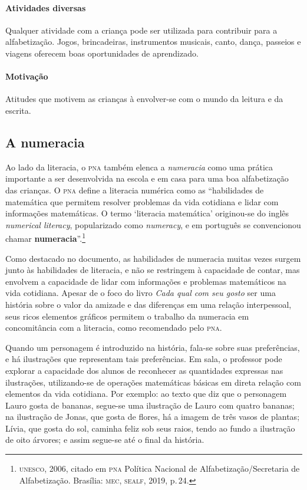 \documentclass[11pt]{extarticle}
\begin{document}
\paragraph{Atividades diversas} Qualquer atividade com a criança 
pode ser utilizada para contribuir para a alfabetização. Jogos, brincadeiras, 
instrumentos musicais, canto, dança, passeios e viagens oferecem boas 
oportunidades de aprendizado.

\paragraph{Motivação} Atitudes que motivem as crianças à envolver-se com 
o mundo da leitura e da escrita.

\subsection{A numeracia}

Ao lado da literacia, o \textsc{pna} também elenca a \textit{numeracia} como uma prática importante a ser desenvolvida na escola e em casa para uma boa alfabetização das crianças.
O \textsc{pna} define a literacia numérica como as ``habilidades de matemática que permitem resolver problemas da vida cotidiana e lidar com informações matemáticas. O termo `literacia
matemática' originou-se do inglês \textit{numerical literacy}, popularizado como
\textit{numeracy}, e em português se convencionou chamar \textbf{numeracia}''.\footnote{\textsc{unesco}, 2006, citado em \textsc{pna} Política Nacional de Alfabetização/Secretaria 
de Alfabetização. Brasília: \textsc{mec, sealf}, 2019, p.\,24.}

Como destacado no documento, as habilidades de numeracia muitas vezes surgem junto às habilidades de literacia, e não se restringem à capacidade de contar, mas envolvem a capacidade de lidar com informações e problemas matemáticos na vida cotidiana. Apesar de o foco do livro \textit{Cada qual com seu gosto} ser uma história sobre o valor da amizade e das diferenças em uma relação interpessoal, seus ricos elementos gráficos permitem o trabalho da numeracia em concomitância com a literacia, como recomendado pelo \textsc{pna}.

Quando um personagem é introduzido na história, fala-se sobre suas preferências, e há ilustrações que representam tais preferências. Em sala, o professor pode explorar a capacidade dos alunos de reconhecer as quantidades expressas nas ilustrações, utilizando-se de operações matemáticas básicas em direta relação com elementos da vida cotidiana. Por exemplo: ao texto que diz que o personagem Lauro gosta de bananas, segue-se uma ilustração de Lauro com quatro bananas; na ilustração de Jonas, que gosta de flores, há a imagem de três vasos de plantas; Lívia, que gosta do sol, caminha feliz sob seus raios, tendo ao fundo a ilustração de oito árvores; e assim segue-se até o final da história.
\end{document}
